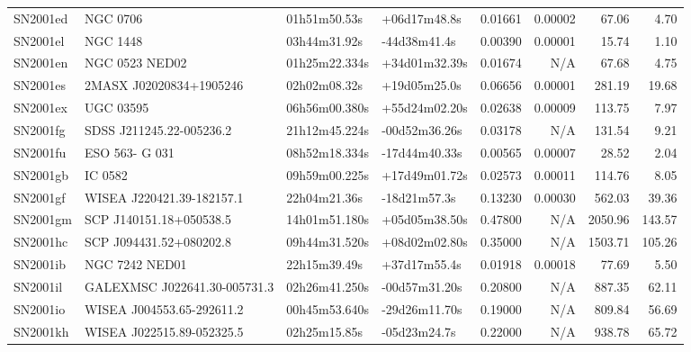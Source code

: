 \begin{longtable}{llllrrrr}
SN2001ed         &                        NGC 0706 &    01h51m50.53s &    +06d17m48.8s &  0.01661 &  0.00002 &    67.06 &        4.70 \\
SN2001el         &                        NGC 1448 &    03h44m31.92s &    -44d38m41.4s &  0.00390 &  0.00001 &    15.74 &        1.10 \\
SN2001en         &                  NGC 0523 NED02 &   01h25m22.334s &   +34d01m32.39s &  0.01674 &      N/A &    67.68 &        4.75 \\
SN2001es         &         2MASX J02020834+1905246 &    02h02m08.32s &    +19d05m25.0s &  0.06656 &  0.00001 &   281.19 &       19.68 \\
SN2001ex         &                       UGC 03595 &   06h56m00.380s &   +55d24m02.20s &  0.02638 &  0.00009 &   113.75 &        7.97 \\
SN2001fg         &        SDSS J211245.22-005236.2 &   21h12m45.224s &   -00d52m36.26s &  0.03178 &      N/A &   131.54 &        9.21 \\
SN2001fu         &                  ESO 563- G 031 &   08h52m18.334s &   -17d44m40.33s &  0.00565 &  0.00007 &    28.52 &        2.04 \\
SN2001gb         &                         IC 0582 &   09h59m00.225s &   +17d49m01.72s &  0.02573 &  0.00011 &   114.76 &        8.05 \\
SN2001gf         &       WISEA J220421.39-182157.1 &    22h04m21.36s &    -18d21m57.3s &  0.13230 &  0.00030 &   562.03 &       39.36 \\
SN2001gm         &         SCP J140151.18+050538.5 &   14h01m51.180s &   +05d05m38.50s &  0.47800 &      N/A &  2050.96 &      143.57 \\
SN2001hc         &         SCP J094431.52+080202.8 &   09h44m31.520s &   +08d02m02.80s &  0.35000 &      N/A &  1503.71 &      105.26 \\
SN2001ib         &                  NGC 7242 NED01 &    22h15m39.49s &    +37d17m55.4s &  0.01918 &  0.00018 &    77.69 &        5.50 \\
SN2001il         &  GALEXMSC J022641.30-005731.3   &   02h26m41.250s &   -00d57m31.20s &  0.20800 &      N/A &   887.35 &       62.11 \\
SN2001io         &       WISEA J004553.65-292611.2 &   00h45m53.640s &   -29d26m11.70s &  0.19000 &      N/A &   809.84 &       56.69 \\
SN2001kh         &       WISEA J022515.89-052325.5 &    02h25m15.85s &    -05d23m24.7s &  0.22000 &      N/A &   938.78 &       65.72 \\

\end{longtable}
